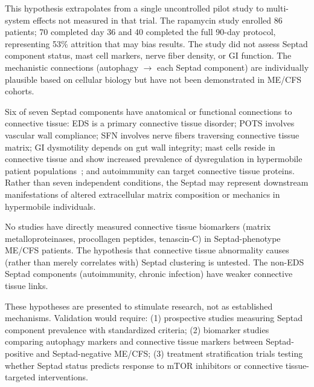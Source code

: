 \begin{limitation}
This hypothesis extrapolates from a single uncontrolled pilot study to multi-system effects not measured in that trial. The rapamycin study enrolled 86 patients; 70 completed day 36 and 40 completed the full 90-day protocol, representing 53\% attrition that may bias results. The study did not assess Septad component status, mast cell markers, nerve fiber density, or GI function. The mechanistic connections (autophagy $\rightarrow$ each Septad component) are individually plausible based on cellular biology but have not been demonstrated in ME/CFS cohorts.
\end{limitation}

\begin{hypothesis}
\label{hyp:ct-septad}
Six of seven Septad components have anatomical or functional connections to connective tissue: EDS is a primary connective tissue disorder; POTS involves vascular wall compliance; SFN involves nerve fibers traversing connective tissue matrix; GI dysmotility depends on gut wall integrity; mast cells reside in connective tissue and show increased prevalence of dysregulation in hypermobile patient populations~\cite{Wang2021triad}; and autoimmunity can target connective tissue proteins. Rather than seven independent conditions, the Septad may represent downstream manifestations of altered extracellular matrix composition or mechanics in hypermobile individuals.
\end{hypothesis}

\begin{limitation}
No studies have directly measured connective tissue biomarkers (matrix metalloproteinases, procollagen peptides, tenascin-C) in Septad-phenotype ME/CFS patients. The hypothesis that connective tissue abnormality causes (rather than merely correlates with) Septad clustering is untested. The non-EDS Septad components (autoimmunity, chronic infection) have weaker connective tissue links.
\end{limitation}

These hypotheses are presented to stimulate research, not as established mechanisms. Validation would require: (1) prospective studies measuring Septad component prevalence with standardized criteria; (2) biomarker studies comparing autophagy markers and connective tissue markers between Septad-positive and Septad-negative ME/CFS; (3) treatment stratification trials testing whether Septad status predicts response to mTOR inhibitors or connective tissue-targeted interventions.

